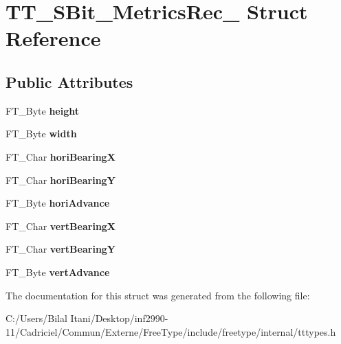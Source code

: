 \hypertarget{struct_t_t___s_bit___metrics_rec__}{}\section{T\+T\+\_\+\+S\+Bit\+\_\+\+Metrics\+Rec\+\_\+ Struct Reference}
\label{struct_t_t___s_bit___metrics_rec__}
\subsection*{Public Attributes}
\begin{DoxyCompactItemize}
\item 
F\+T\+\_\+\+Byte {\bfseries height}\hypertarget{struct_t_t___s_bit___metrics_rec___a79b25794122888101aae80c7b74fc1fc}{}\label{struct_t_t___s_bit___metrics_rec___a79b25794122888101aae80c7b74fc1fc}

\item 
F\+T\+\_\+\+Byte {\bfseries width}\hypertarget{struct_t_t___s_bit___metrics_rec___a3444618e2c2a612a662a5e0d2c3f25ef}{}\label{struct_t_t___s_bit___metrics_rec___a3444618e2c2a612a662a5e0d2c3f25ef}

\item 
F\+T\+\_\+\+Char {\bfseries hori\+BearingX}\hypertarget{struct_t_t___s_bit___metrics_rec___a786ba1081993e18d514ddf37c2662c7b}{}\label{struct_t_t___s_bit___metrics_rec___a786ba1081993e18d514ddf37c2662c7b}

\item 
F\+T\+\_\+\+Char {\bfseries hori\+BearingY}\hypertarget{struct_t_t___s_bit___metrics_rec___aaed1567b444a1bee4b3478b2cdb9259f}{}\label{struct_t_t___s_bit___metrics_rec___aaed1567b444a1bee4b3478b2cdb9259f}

\item 
F\+T\+\_\+\+Byte {\bfseries hori\+Advance}\hypertarget{struct_t_t___s_bit___metrics_rec___a8b0c5271aaf220f7a8cbf4838854e220}{}\label{struct_t_t___s_bit___metrics_rec___a8b0c5271aaf220f7a8cbf4838854e220}

\item 
F\+T\+\_\+\+Char {\bfseries vert\+BearingX}\hypertarget{struct_t_t___s_bit___metrics_rec___a626e67e02494faab653a7543bb0b7c79}{}\label{struct_t_t___s_bit___metrics_rec___a626e67e02494faab653a7543bb0b7c79}

\item 
F\+T\+\_\+\+Char {\bfseries vert\+BearingY}\hypertarget{struct_t_t___s_bit___metrics_rec___aef4755ed22ba72e5fa304920bae03146}{}\label{struct_t_t___s_bit___metrics_rec___aef4755ed22ba72e5fa304920bae03146}

\item 
F\+T\+\_\+\+Byte {\bfseries vert\+Advance}\hypertarget{struct_t_t___s_bit___metrics_rec___a947468e42759089d0b5c5fa10a0defdf}{}\label{struct_t_t___s_bit___metrics_rec___a947468e42759089d0b5c5fa10a0defdf}

\end{DoxyCompactItemize}


The documentation for this struct was generated from the following file\+:\begin{DoxyCompactItemize}
\item 
C\+:/\+Users/\+Bilal Itani/\+Desktop/inf2990-\/11/\+Cadriciel/\+Commun/\+Externe/\+Free\+Type/include/freetype/internal/tttypes.\+h\end{DoxyCompactItemize}
